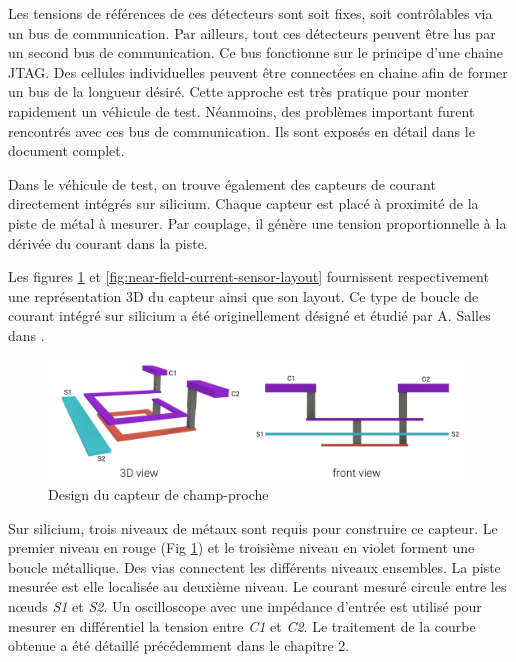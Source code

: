 Les tensions de références de ces détecteurs sont soit fixes, soit contrôlables via un bus de communication.
Par ailleurs, tout ces détecteurs peuvent être lus par un second bus de communication.
Ce bus fonctionne sur le principe d'une chaine JTAG.
Des cellules individuelles peuvent être connectées en chaine afin de former un bus de la longueur désiré.
Cette approche est très pratique pour monter rapidement un véhicule de test.
Néanmoins, des problèmes important furent rencontrés avec ces bus de communication.
Ils sont exposés en détail dans le document complet.

Dans le véhicule de test, on trouve également des capteurs de courant directement intégrés sur silicium.
Chaque capteur est placé à proximité de la piste de métal à mesurer.
Par couplage, il génère une tension proportionnelle à la dérivée du courant dans la piste.

Les figures \ref{fig:near-field-current-sensor} et \ref{fig:near-field-current-sensor-layout} fournissent respectivement une représentation 3D du capteur ainsi que son layout.
Ce type de boucle de courant intégré sur silicium a été originellement désigné et étudié par A. Salles dans \cite{AlainSallesInductors}.

\begin{figure}[!h]
  \centering
  \includegraphics[width=0.98\textwidth]{src/1/figures/near-field-current-sensor.pdf}
  \caption{Design du capteur de champ-proche}
  \label{fig:near-field-current-sensor}
\end{figure}

Sur silicium, trois niveaux de métaux sont requis pour construire ce capteur.
Le premier niveau en rouge (Fig \ref{fig:near-field-current-sensor}) et le troisième niveau en violet forment une boucle métallique.
Des vias connectent les différents niveaux ensembles.
La piste mesurée est elle localisée au deuxième niveau.
Le courant mesuré circule entre les nœuds \textit{S1} et \textit{S2}.
Un oscilloscope avec une impédance d'entrée \textOmega{} est utilisé pour mesurer en différentiel la tension entre \textit{C1} et \textit{C2}.
Le traitement de la courbe obtenue a été détaillé précédemment dans le chapitre 2.

